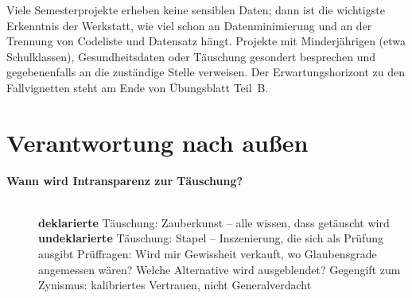 \begin{lehrhinweis}
Viele Semesterprojekte erheben keine sensiblen Daten; dann ist die
wichtigste Erkenntnis der Werkstatt, wie viel schon an Datenminimierung und
an der Trennung von Codeliste und Datensatz hängt. Projekte mit
Minderjährigen (etwa Schulklassen), Gesundheitsdaten oder Täuschung
gesondert besprechen und gegebenenfalls an die zuständige Stelle verweisen.
Der Erwartungshorizont zu den Fallvignetten steht am Ende von
Übungsblatt Teil~B.
\end{lehrhinweis}

\section{Verantwortung nach außen}
\begin{description}
\item[{\rot\bf Wann wird Intransparenz zur Täuschung?}]~\\[-\lblskip]
\bi
  \ite \textbf{deklarierte} Täuschung: Zauberkunst -- alle wissen, dass
    getäuscht wird
  \ite \textbf{undeklarierte} Täuschung: Stapel -- Inszenierung, die sich
    als Prüfung ausgibt \parencite{levelt2012flawed}
  \ite Prüffragen: Wird mir Gewissheit verkauft, wo Glaubensgrade
    angemessen wären? Welche Alternative wird ausgeblendet?
  \ite Gegengift zum Zynismus: kalibriertes Vertrauen, nicht Generalverdacht
\ei
\os{\newpage}
\end{description}


